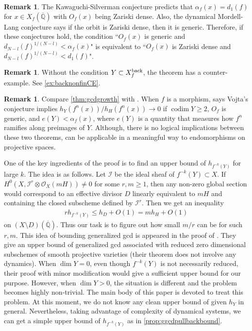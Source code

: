 \documentclass[12pt]{amsart}
\theoremstyle{plain}
\theoremstyle{definition}
\newtheorem{remark}[theorem]{Remark}
\numberwithin{equation}{section}
\def\QQ{\overline{\mathbb Q}}
\def\O{{ \mathcal{O}}}
\def\I{{ \mathcal{I}}}
\DeclareMathOperator{\codim}{codim}
\begin{document}
\begin{remark}
The Kawaguchi-Silverman conjecture predicts that $ \alpha_{f}(x) = d_{1}(f)$
for $x \in X_{f}(\QQ)$ with $O_{f}(x)$ being Zariski dense.
Also, the dynamical Mordell-Lang conjecture says if the orbit is Zariski dense, then it is generic.
Therefore, if these conjectures hold, the condition ``$O_{f}(x)$ is generic and $d_{N-l}(f)^{1/(N-l)} < \alpha_{f}(x)$"
is equivalent to ``$O_{f}(x)$ is Zariski dense and $d_{N-l}(f)^{1/(N-l)} < d_{1}(f)$".
\end{remark}

\begin{remark}
Without the condition $Y \subset X_{f}^{\rm back}$, the theorem has a counter-example.
See \cref{ex:backnonfinCE}.
\end{remark}

\begin{remark}
Compare \cref{thm:gcdgrowth} with \cite[Theorem 1.6]{matsuzawa2020vojta}.
When $f$ is a morphism, \cite[Theorem 1.6]{matsuzawa2020vojta} says Vojta's conjecture 
implies $h_{Y}(f^{n}(x))/h_{H}(f^{n}(x)) \to 0$ if  $\codim Y \geq 2$, $O_{f}$ is generic, and
$e(Y) < \alpha_{f}(x)$, where $e(Y)$ is a quantity that measures how $f^{n}$ ramifies 
along preimages of $Y$.
Although, there is no logical implications between these two theorems,
\cite[Theorem 1.6]{matsuzawa2020vojta} can be applicable in a meaningful way to endomorphisms on projective spaces.
\end{remark}



One of the key ingredients of the proof is to find an upper bound of
$h_{f^{-k}(Y)}$ for large $k$.
The idea is as follows. Let $\I$ be the ideal sheaf of $f^{-k}(Y) \subset X$.
If $H^{0}(X, \I^{r} \otimes \O_{X}(mH)) \neq 0$ for some $r, m \geq 1$,
then any non-zero global section would correspond to an effective divisor $D$ linearly equivalent to $mH$
and containing the closed subscheme defined by $\I^{r}$.
Then we get an inequality
\begin{align}
rh_{f^{-k}(Y)} \leq h_{D} + O(1) = mh_{H} + O(1)
\end{align}
on $(X \setminus D)(\QQ)$.
Thus our task is to figure out how small $m/r$ can be for such $r,m$. 
This idea of bounding generalized gcd is appeared in the proof of \cite[Theorem 3.1]{GP24}.
They give an upper bound of generalized gcd associated with reduced zero dimensional subschemes 
of smooth projective varieties (their theorem does not involve any dynamics).
When $\dim Y =0$, even though $f^{-k}(Y)$ is not necessarily reduced, their proof with
minor modification would give a sufficient upper bound for our purpose.
However, when $\dim Y > 0$, the situation is different and 
the problem becomes highly non-trivial. 
The main body of this paper is devoted to treat this problem.
At this moment, we do not know any clean upper bound of given $h_{Y}$ in general.  
Nevertheless, taking advantage of complexity of dynamical systems,  
we can get a simple upper bound of $h_{f^{-k}(Y)}$ as in \cref{prop:ggcdpullbackbound}.
\end{document}
